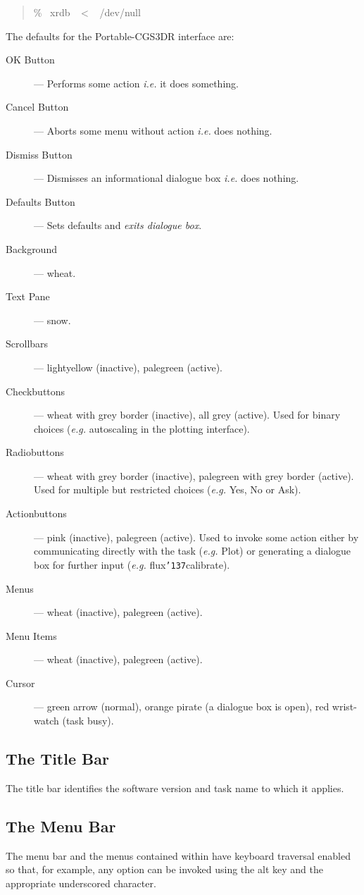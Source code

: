 \documentclass[a4paper]{book}
\renewcommand{\_}{{\tt\char'137}}
\begin{document}
\begin{quote}
 \% \ xrdb \ $<$ \ /dev/null \\
\end{quote}

The defaults for the Portable-CGS3DR interface are:
\begin{description}
\item[{\sf OK Button}] --- Performs some action {\em i.e.} it does something.
\item[{\sf Cancel Button}] --- Aborts some menu without action {\em i.e.} does nothing.
\item[{\sf Dismiss Button}] --- Dismisses an informational dialogue box {\em i.e.} does nothing.
\item[{\sf Defaults Button}] --- Sets defaults and {\em exits dialogue box}.
\item[{\sf Background}] --- wheat.
\item[{\sf Text Pane}] --- snow.
\item[{\sf Scrollbars}] --- lightyellow (inactive), palegreen (active).
\item[{\sf Checkbuttons}] --- wheat with grey border (inactive), all grey (active). Used
for binary choices ({\em e.g.} autoscaling in the plotting interface).
\item[{\sf Radiobuttons}] --- wheat with grey border (inactive), palegreen with grey border (active).
Used for multiple but restricted choices ({\em e.g.} {\sf Yes}, {\sf No} or {\sf Ask}).
\item[{\sf Actionbuttons}] --- pink (inactive), palegreen (active). Used to invoke some action
either by communicating directly with the task ({\em e.g.} Plot) or generating a dialogue box
for further input ({\em e.g.} flux\_calibrate).
\item[{\sf Menus}] --- wheat (inactive), palegreen (active).
\item[{\sf Menu Items}] --- wheat (inactive), palegreen (active).
\item[{\sf Cursor}] --- green arrow (normal), orange pirate (a dialogue box is open), red wrist-watch (task busy).
\end{description}

\subsection{The Title Bar}
The title bar identifies the software version and task name to which it applies.

\subsection{The Menu Bar}
The menu bar and the menus contained within have keyboard traversal enabled so that, for example, any option
can be invoked using the {\sc alt} key and the appropriate underscored character.
\end{document}
